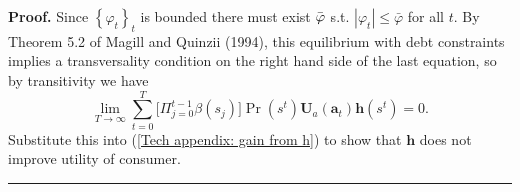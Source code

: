 \documentclass[thmsb,11pt]{article}
\newenvironment{proof}[1][Proof]{\noindent \textbf{#1.} }{\  \rule{0.5em}{0.5em}}
\begin{document}
\begin{proof}
Since $\left\{ \varphi _{t}\right\} _{t}$ is bounded there must exist $\bar{%
\varphi}$ s.t. $|\varphi _{t}|\leq \bar{\varphi}$ for all $t$. By Theorem
5.2 of Magill and Quinzii (1994), this equilibrium with debt constraints
implies a transversality condition on the right hand side of the last
equation, so by transitivity we have%
\begin{equation*}
\lim_{T\rightarrow \infty }\sum_{t=0}^{T}\bigl[\Pi_{j=0}^{t-1} \beta(s_j)\bigr]\Pr \left( s^{t}\right)
\bm{U}_{a}(\bm{a}_{t})\bm{h}\left( s^{t}\right) =0.
\end{equation*}%
Substitute this into (\ref{Tech appendix: gain from h}) to show that $%
\bm{h}$ does not improve utility of consumer.
\end{proof}

\smallskip
%
%
%
%
%
%
\end{document}
